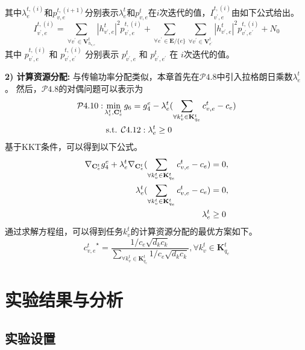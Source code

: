其中$\lambda_{e}^{t,(i)}$和$p_{v, e}^{t, (i+1)}$分别表示$\lambda_{e}^{t}$和$p_{v, e}^{t}$在$i$次迭代的值，${I}_{v^{\prime}, e}^{t, (i)}$由如下公式给出。
\begin{equation}
	{I}_{v^{\prime}, e}^{t, (i)} = \sum\limits_{\forall v^{\prime} \in \mathbf{V}_{h_{v, e}}^{t}} |h_{v^{\prime}, e}^t|^2 p_{v^{\prime}, e}^{t, (i)} + \sum\limits_{\forall e^{\prime} \in \mathbf{E} / \{e\}} \sum\limits_{\forall v^{\prime} \in \mathbf{V}_{e^{\prime}}^{t}} |h_{v^{\prime}, e}^t|^2 p_{v^{\prime}, e^{\prime}}^{t, (i)} + N_{0}
\end{equation}
其中 $p_{v^{\prime}, e}^{t, (i)}$ 和 $p_{v^{\prime}, e^{\prime}}^{t, (i)}$ 分别表示 $p_{v^{\prime}, e}^{t}$ 和 $p_{v^{\prime}, e^{\prime}}^{t}$ 在 $i$次迭代的值。

\textbf{2) 计算资源分配:} 与传输功率分配类似，本章首先在$\mathcal{P}4.8$中引入拉格朗日乘数${\lambda}_{e}^{t}$。
然后，$\mathcal{P}4.8$的对偶问题可以表示为
\begin{align}
	\mathcal{P}4.10: & \min_{\mathbf{\lambda}_{e}^{t}, \mathbf{{C}}_{e}^{t}}  g_6 = g_4^e - {\lambda}_{e}^{t} (\sum_{\forall k_{v}^{t} \in {\mathbf{K}_{q_e}^{t} }} {c_{v, e}^t} - c_{e} ) \notag \\
		&\text { s.t. } \mathcal{C}4.12: \mathbf{\lambda}_{e}^{t} \geq 0 
\end{align}
基于KKT条件\cite{boyd2004convex}，可以得到以下公式。
\begin{align}
	\nabla_{\mathbf{C}_e^{t}} g_4^e + \mathbf{\lambda}_{e}^{t}\nabla_{\mathbf{C}_e^{t}} (\sum_{\forall k_{v}^{t} \in {\mathbf{K}_{q_e}^{t} }} {c_{v, e}^t} - c_{e} ) &= 0, \notag \\
	\mathbf{\lambda}_{e}^{t}( \sum_{\forall k_{v}^{t} \in {\mathbf{K}_{q_e}^{t} }} {c_{v, e}^t} - {c_{e}} ) &= 0, \notag \\
	\mathbf{\lambda}_{e}^{t} &\geq 0
\end{align}
通过求解方程组，可以得到任务$k_{v}^{t}$的计算资源分配的最优方案如下。
\begin{equation}
	{c_{v, e}^{t}}^{\star} = \frac{1 / c_e \sqrt{d_k  c_k} } {\sum_{\forall k_{v}^{t} \in {\mathbf{K}_{q_e}^{t} }} 1 / c_e \sqrt{d_k  c_k}} , \forall k_{v}^{t} \in {\mathbf{K}_{q_e}^{t} } 
\end{equation}

\section{实验结果与分析}\label{section 4-5}

\subsection{实验设置}

